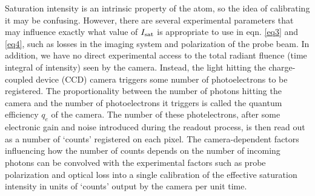 Saturation intensity is an intrinsic property of the atom, so the idea of calibrating it may be confusing. However, there are several experimental parameters that may influence exactly what value of $I_{\rm{sat}}$ is appropriate to use in eqn. \ref{eq3} and \ref{eq4}, such as losses in the imaging system and polarization of the probe beam. In addition, we have no direct experimental access to the total radiant fluence (time integral of intensity) seen by the camera. Instead, the light hitting the charge-coupled device (CCD) camera triggers some number of photoelectrons to be registered. The proportionality between the number of photons hitting the camera and the number of photoelectrons it triggers is called the quantum efficiency $q_e$ of the camera. The number of these photelectrons, after some electronic gain and noise introduced during the readout process, is then read out as a number of \lq{counts}\rq{} registered on each pixel. The camera-dependent factors influencing how the number of counts depends on the number of incoming photons can be convolved with the experimental factors such as probe polarization and optical loss into a single calibration of the effective saturation intensity in units of  \lq{counts}\rq{} output by the camera per unit time. 

